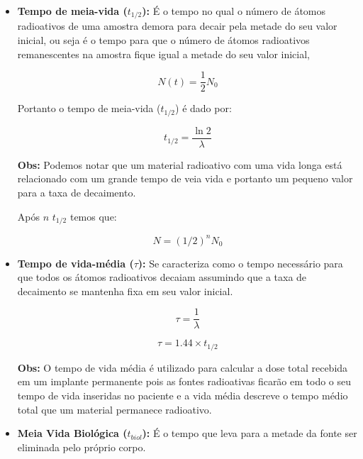 \documentclass[11pt,a4paper]{article}
\begin{document}
\begin{itemize}
			\item \textbf{Tempo de meia-vida ($t_{1/2}$): } É o tempo no qual o número de átomos radioativos de uma amostra demora para decair pela metade do seu valor inicial, ou seja é o tempo para que o número de átomos radioativos remanescentes na amostra fique igual a metade do seu valor inicial, 
			
				\begin{equation}
					N(t) = \frac{1}{2}N_0
				\end{equation}

				Portanto o tempo de meia-vida  ($t_{1/2}$) é dado por:

				\begin{equation}
					t_{1/2} = \frac{\ln 2}{\lambda}
				\end{equation}

				\textbf{\textcolor{CarnationPink}{Obs:} } Podemos notar que um material radioativo com uma vida longa está relacionado com um grande tempo de veia vida e portanto um pequeno valor para a taxa de decaimento.

				Após $n$ $t_{1/2}$ temos que:

				\begin{equation}
					N = \left({1/2}\right)^n N_0
				\end{equation}



			\item \textbf{Tempo de vida-média ($\tau$): } Se caracteriza como o tempo necessário para que todos os átomos radioativos decaiam assumindo que a taxa de decaimento se mantenha fixa em seu valor inicial.
			
				\begin{equation}
					\tau = \frac{1}{\lambda}
				\end{equation}

				\begin{equation}
					\tau = 1.44 \times t_{1/2}
				\end{equation}

				\textbf{\textcolor{CarnationPink}{Obs:} } O tempo de vida média é utilizado para calcular a dose total recebida em um implante permanente pois as fontes radioativas ficarão em todo o seu tempo de vida inseridas no paciente e a vida média descreve o tempo médio total que um material permanece radioativo.

			\item \textbf{Meia Vida Biológica ($t_{biol}$): } É o tempo que leva para a metade da fonte ser eliminada pelo próprio corpo.
			

\end{itemize}
\end{document}

